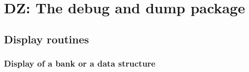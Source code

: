\chapter{DZ: The debug and dump package}
\label{sec:dzdescription}

\section{Display routines}

\subsection{Display of a bank or a data structure}

